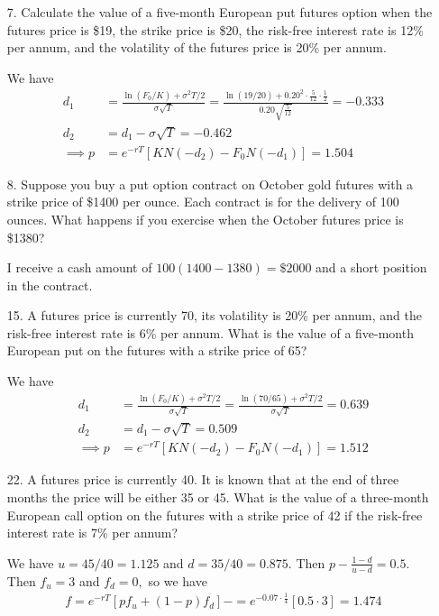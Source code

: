 \documentclass{article}
\begin{document}
\begin{itemize}
	\item[7.] Calculate the value of a five-month European put futures option when the futures price is \$19, the strike price is \$20, the risk-free interest rate is 12\% per annum, and the volatility of the futures price is 20\% per annum.
		\begin{soln}
			We have
			\begin{align*}
				d_1 &= \frac{\ln(F_0/K)+\sigma^2T/2}{\sigma\sqrt{T}} = \frac{\ln(19/20) + 0.20^2\cdot \frac{5}{12}\cdot \frac{1}{2}}{0.20\sqrt{\frac{5}{12}}} = -0.333 \\
				d_2 &= d_1-\sigma\sqrt{T} = -0.462 \\
				\implies p &= e^{-rT}\left[ KN(-d_2)-F_0N(-d_1) \right] = 1.504
			\end{align*}
		\end{soln}

	\item[8.] Suppose you buy a put option contract on October gold futures with a strike price of \$1400 per ounce. Each contract is for the delivery of 100 ounces. What happens if you exercise when the October futures price is \$1380?
		\begin{soln}
			I receive a cash amount of $100(1400-1380)=\$2000$ and a short position in the contract.
		\end{soln}

	\item[15.] A futures price is currently 70, its volatility is 20\% per annum, and the risk-free interest rate is 6\% per annum. What is the value of a five-month European put on the futures with a strike price of 65?
		\begin{soln}
			We have
			\begin{align*}
				d_1 &= \frac{\ln(F_0/K)+\sigma^2T/2}{\sigma\sqrt{T}} = \frac{\ln(70/65)+\sigma^2T/2}{\sigma\sqrt{T}} = 0.639 \\
				d_2 &= d_1-\sigma\sqrt{T} = 0.509 \\
				\implies p &= e^{-rT}\left[ KN(-d_2)-F_0N(-d_1) \right] = 1.512
			\end{align*}
		\end{soln}

	\item[22.] A futures price is currently 40. It is known that at the end of three months the price will be either 35 or 45. What is the value of a three-month European call option on the futures with a strike price of 42 if the risk-free interest rate is 7\% per annum?
		\begin{soln}
			We have $u=45/40=1.125$ and $d=35/40=0.875.$ Then $p-\frac{1-d}{u-d} = 0.5.$ Then $f_u=3$ and $f_d=0,$ so we have
			\begin{align*}
				f= e^{-rT}\left[ pf_u + (1-p)f_d \right] -= e^{-0.07\cdot \frac{1}{4}}\left[ 0.5\cdot 3 \right] = 1.474
			\end{align*}
		\end{soln}
		
\end{itemize}
\end{document}
